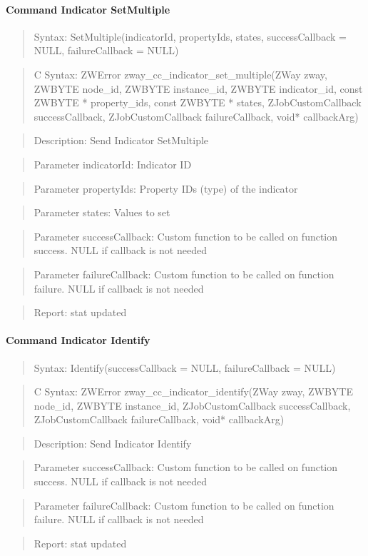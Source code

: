 \paragraph{Command Indicator SetMultiple}
\begin{quote}Syntax: SetMultiple(indicatorId, propertyIds, states, successCallback = NULL, failureCallback = NULL)\end{quote}
\begin{quote}C Syntax: ZWError zway\_cc\_indicator\_set\_multiple(ZWay zway, ZWBYTE node\_id, ZWBYTE instance\_id, ZWBYTE indicator\_id, const ZWBYTE * property\_ids, const ZWBYTE * states, ZJobCustomCallback successCallback, ZJobCustomCallback failureCallback, void* callbackArg)\end{quote}
\begin{quote}Description: Send Indicator SetMultiple\end{quote}
\begin{quote}Parameter indicatorId: Indicator ID\end{quote}
\begin{quote}Parameter propertyIds: Property IDs (type) of the indicator\end{quote}
\begin{quote}Parameter states: Values to set\end{quote}
\begin{quote}Parameter successCallback: Custom function to be called on function success. NULL if callback is not needed\end{quote}
\begin{quote}Parameter failureCallback: Custom function to be called on function failure. NULL if callback is not needed\end{quote}
\begin{quote}Report: stat updated\end{quote}

\paragraph{Command Indicator Identify}
\begin{quote}Syntax: Identify(successCallback = NULL, failureCallback = NULL)\end{quote}
\begin{quote}C Syntax: ZWError zway\_cc\_indicator\_identify(ZWay zway, ZWBYTE node\_id, ZWBYTE instance\_id, ZJobCustomCallback successCallback, ZJobCustomCallback failureCallback, void* callbackArg)\end{quote}
\begin{quote}Description: Send Indicator Identify\end{quote}
\begin{quote}Parameter successCallback: Custom function to be called on function success. NULL if callback is not needed\end{quote}
\begin{quote}Parameter failureCallback: Custom function to be called on function failure. NULL if callback is not needed\end{quote}
\begin{quote}Report: stat updated\end{quote}


